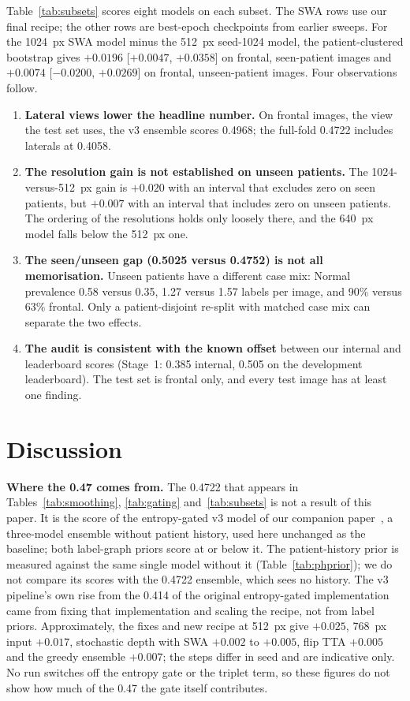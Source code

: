 \documentclass[conference]{IEEEtran}
\begin{document}
Table~\ref{tab:subsets} scores eight models on each subset. The SWA rows use our final recipe; the other rows are best-epoch checkpoints from earlier sweeps. For the 1024~px SWA model minus the 512~px seed-1024 model, the patient-clustered bootstrap gives $+0.0196$ [$+0.0047$, $+0.0358$] on frontal, seen-patient images and $+0.0074$ [$-0.0200$, $+0.0269$] on frontal, unseen-patient images. Four observations follow.
\begin{enumerate}
\item \textbf{Lateral views lower the headline number.} On frontal images, the view the test set uses, the v3 ensemble scores 0.4968; the full-fold 0.4722 includes laterals at 0.4058.
\item \textbf{The resolution gain is not established on unseen patients.} The 1024-versus-512~px gain is $+0.020$ with an interval that excludes zero on seen patients, but $+0.007$ with an interval that includes zero on unseen patients. The ordering of the resolutions holds only loosely there, and the 640~px model falls below the 512~px one.
\item \textbf{The seen/unseen gap (0.5025 versus 0.4752) is not all memorisation.} Unseen patients have a different case mix: Normal prevalence 0.58 versus 0.35, 1.27 versus 1.57 labels per image, and 90\% versus 63\% frontal. Only a patient-disjoint re-split with matched case mix can separate the two effects.
\item \textbf{The audit is consistent with the known offset} between our internal and leaderboard scores (Stage~1: 0.385 internal, 0.505 on the development leaderboard). The test set is frontal only, and every test image has at least one finding.
\end{enumerate}

\section{Discussion}
\textbf{Where the 0.47 comes from.} The 0.4722 that appears in Tables~\ref{tab:smoothing}, \ref{tab:gating} and~\ref{tab:subsets} is not a result of this paper. It is the score of the entropy-gated v3 model of our companion paper~\cite{b25}, a three-model ensemble without patient history, used here unchanged as the baseline; both label-graph priors score at or below it. The patient-history prior is measured against the same single model without it (Table~\ref{tab:phprior}); we do not compare its scores with the 0.4722 ensemble, which sees no history. The v3 pipeline's own rise from the 0.414 of the original entropy-gated implementation came from fixing that implementation and scaling the recipe, not from label priors. Approximately, the fixes and new recipe at 512~px give $+0.025$, 768~px input $+0.017$, stochastic depth with SWA $+0.002$ to $+0.005$, flip TTA $+0.005$ and the greedy ensemble $+0.007$; the steps differ in seed and are indicative only. No run switches off the entropy gate or the triplet term, so these figures do not show how much of the 0.47 the gate itself contributes.
\end{document}
